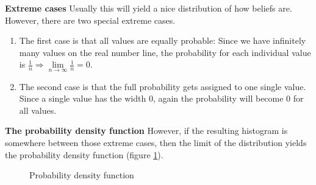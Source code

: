 \documentclass[../main/Notes.tex]{subfiles}
\begin{document}
\begin{samepage}
\textbf{Extreme cases}
Usually this will yield a nice distribution of how beliefs are. However, there are two special extreme cases.

\begin{enumerate}
  \item[] The first case is that all values are equally probable: Since we have infinitely many values on the real number line, the probability for each individual value is $\frac{1}{n} \Rightarrow \lim\limits_{n\rightarrow\infty} \frac{1}{n} = 0$. 
  \item[] The second case is that the full probability gets assigned to one single value. Since a single value has the width 0, again the probability will become 0 for all values.
\end{enumerate}
\end{samepage}

\textbf{The probability density function}
However, if the resulting histogram is somewhere between those extreme cases, then the limit of the distribution yields the probability density function (figure \ref{fig:2014-05-09_pdf}).

\begin{figure}[!ht]
\centering
{}
\caption{Probability density function}
\label{fig:2014-05-09_pdf}
\end{figure}
\end{document}
